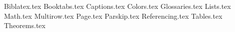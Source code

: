 {Biblatex.tex}
{Booktabs.tex}
{Captions.tex}
{Colors.tex}
{Glossaries.tex}
{Lists.tex}
{Math.tex}
{Multirow.tex}
{Page.tex}
{Parskip.tex}
{Referencing.tex}
{Tables.tex}
{Theorems.tex}
\usepackage[english]{babel}
\usepackage{csquotes}
\usepackage{expl3}
\usepackage{fontspec}
\usepackage{graphicx}
\usepackage{keyval}
\usepackage{url}
\usepackage{xparse}
\usepackage{blindtext}
\usepackage{datetime2}
\usepackage{float}
\usepackage{algorithm}
\usepackage{algpseudocode}
\usepackage{kbordermatrix}
